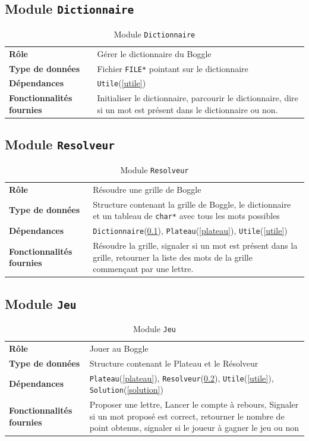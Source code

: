 \documentclass[12pt,a4paper,openany]{article}
\begin{document}
	\subsection{Module \texttt{Dictionnaire}}\label{dictionnaire}
		\begin{table}[H]
			\centering
		\begin{tabular}{p{5cm} p{12cm}}
			\textbf{Rôle} & Gérer le dictionnaire du Boggle\\
			\textbf{Type de données} & Fichier \texttt{FILE*} pointant sur le dictionnaire\\
			\textbf{Dépendances} & \texttt{Utile}(\ref{utile})\\
			\textbf{Fonctionnalités fournies} & Initialiser le dictionnaire, parcourir le dictionnaire, dire si un mot est présent dans le dictionnaire ou non. 
		\end{tabular}
		\caption{Module \texttt{Dictionnaire}}
	\end{table}
	\subsection{Module \texttt{Resolveur}}\label{resolveur}
		\begin{table}[H]
			\centering
		\begin{tabular}{p{5cm} p{12cm}}
			\textbf{Rôle} & Résoudre une grille de Boggle\\
			\textbf{Type de données} & Structure contenant la grille de Boggle, le dictionnaire et un tableau de \texttt{char*} avec tous les mots possibles\\
			\textbf{Dépendances} & \texttt{Dictionnaire}(\ref{dictionnaire}), \texttt{Plateau}(\ref{plateau}), \texttt{Utile}(\ref{utile})\\
			\textbf{Fonctionnalités fournies} & Résoudre la grille, signaler si un mot est présent dans la grille, retourner la liste des mots de la grille
			commençant par une lettre. 
		\end{tabular}
		\caption{Module \texttt{Resolveur}}
	\end{table}
	\subsection{Module \texttt{Jeu}}\label{jeu}
		\begin{table}[H]
			\centering
		\begin{tabular}{p{5cm} p{12cm}}
			\textbf{Rôle} & Jouer au Boggle \\ 
			\textbf{Type de données} & Structure contenant le Plateau et le Résolveur\\ 
			\textbf{Dépendances} & \texttt{Plateau}(\ref{plateau}), \texttt{Resolveur}(\ref{resolveur}),
			\texttt{Utile}(\ref{utile}), \texttt{Solution}(\ref{solution})\\
			\textbf{Fonctionnalités fournies} & Proposer une lettre, Lancer le compte à rebours, Signaler si un mot proposé est correct, retourner le nombre de
			point obtenus, signaler si le joueur à gagner le jeu ou non
		\end{tabular}
		\caption{Module \texttt{Jeu}}
	\end{table}
\end{document}
